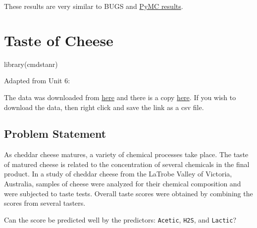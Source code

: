 \documentclass[
  letterpaper,
  DIV=11,
  numbers=noendperiod]{scrreprt}
\newenvironment{Shaded}{\begin{snugshade}}{\end{snugshade}}
\newcommand{\FunctionTok}[1]{\textcolor[rgb]{0.28,0.35,0.67}{#1}}
\newcommand{\NormalTok}[1]{\textcolor[rgb]{0.00,0.23,0.31}{#1}}
\begin{document}
These results are very similar to BUGS and
\href{https://areding.github.io/6420-pymc/unit6/Unit6-demo-psoriasis.html}{PyMC
results}.

\hypertarget{taste-of-cheese}{%
\chapter*{Taste of Cheese}\label{taste-of-cheese}}


\begin{Shaded}
\begin{Highlighting}[]
\FunctionTok{library}\NormalTok{(cmdstanr)}
\end{Highlighting}
\end{Shaded}

Adapted from Unit 6:

The data was downloaded from
\href{https://www3.nd.edu/~busiforc/handouts/Data\%20and\%20Stories/multicollinearity/Cheese\%20Taste/Cheddar\%20Cheese\%20Data.html}{here}
and there is a copy \href{../data/cheese.csv}{here}. If you wish to
download the data, then right click and save the link as a csv file.

\hypertarget{problem-statement-4}{%
\section*{Problem Statement}\label{problem-statement-4}}


As cheddar cheese matures, a variety of chemical processes take place.
The taste of matured cheese is related to the concentration of several
chemicals in the final product. In a study of cheddar cheese from the
LaTrobe Valley of Victoria, Australia, samples of cheese were analyzed
for their chemical composition and were subjected to taste tests.
Overall taste scores were obtained by combining the scores from several
tasters.

Can the score be predicted well by the predictors: \texttt{Acetic},
\texttt{H2S}, and \texttt{Lactic}?
\end{document}
